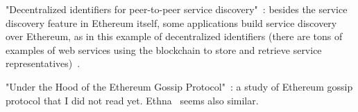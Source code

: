 "Decentralized identifiers for peer-to-peer service discovery"~\cite{farmer2021decentralized}: besides the service discovery feature in Ethereum itself, some applications build service discovery over Ethereum, as in this example of decentralized identifiers (there are tons of examples of web services using the blockchain to store and retrieve service representatives)~\cite{keizer2021flock}.

"Under the Hood of the Ethereum Gossip Protocol"~\cite{kiffer2021under}: a study of Ethereum gossip protocol that I did not read yet.
Ethna~\cite{wang2021ethna} seems also similar.
